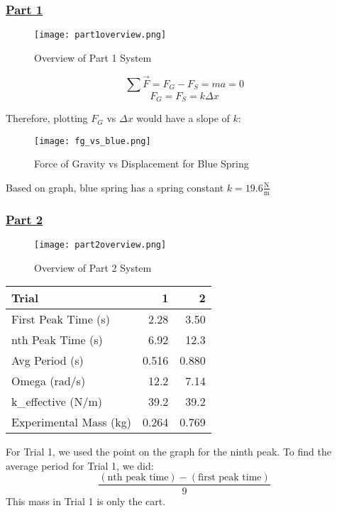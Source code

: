 \documentclass[fleqn]{article}
\begin{document}
\subsubsection*{\underline{Part 1}}

\begin{figure}[H]
	\caption*{Overview of Part 1 System}
	\texttt{[image: part1overview.png]}
\end{figure}

\[ \sum \vec{F} = F_G - F_S = ma = 0 \]
\[ F_G = F_S = k \Delta x  \]

Therefore, plotting $F_G$ vs $\Delta x$ would have a slope of $k$:

\begin{figure}[H]
	\caption*{Force of Gravity vs Displacement for Blue Spring}
	\texttt{[image: fg\_vs\_blue.png]}
\end{figure}
Based on graph, blue spring has a spring constant $\boxed{k=19.6 \frac{\text{N} }{\text{m} }}$

\subsubsection*{\underline{Part 2}}

\begin{figure}[H]
	\caption*{Overview of Part 2 System}
	\centering
	\texttt{[image: part2overview.png]}
\end{figure}

\begin{table}[H]
	\setlength{\extrarowheight}{2pt}
	\begin{tabular}{|l|r|r|}
		\hline
		Trial                  & 1     & 2     \\ \hline
		First Peak Time (s)    & 2.28  & 3.50  \\ \hline
		nth Peak Time (s)      & 6.92  & 12.3  \\ \hline
		Avg Period (s)         & 0.516 & 0.880 \\ \hline
		Omega (rad/s)          & 12.2  & 7.14  \\ \hline
		k\_effective (N/m)     & 39.2  & 39.2  \\ \hline
		Experimental Mass (kg) & 0.264 & 0.769 \\ \hline
	\end{tabular}
\end{table}

For Trial 1, we used the point on the graph for the ninth peak. To find the average period for Trial 1, we did:
\[ \frac{(\text{nth peak time} ) - (\text{first peak time} )}{9} \]
This mass in Trial 1 is only the cart.
\end{document}
